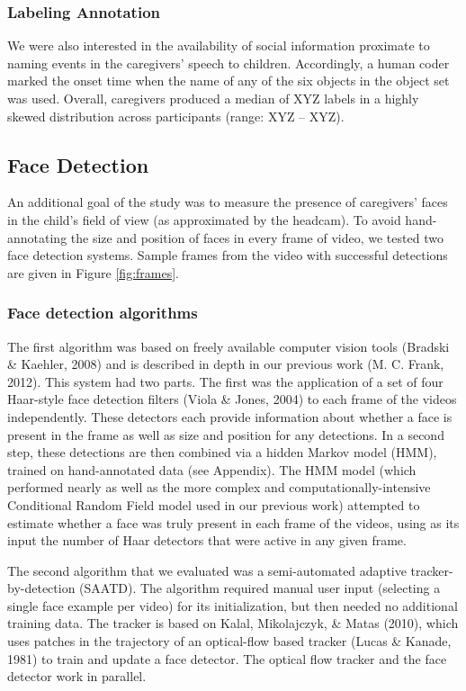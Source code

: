 \documentclass[a4paper,man,apacite,floatsintext,longtable]{apa6}
\begin{document}
\subsubsection{Labeling Annotation}\label{labeling-annotation}

We were also interested in the availability of social information
proximate to naming events in the caregivers' speech to children.
Accordingly, a human coder marked the onset time when the name of any of
the six objects in the object set was used. Overall, caregivers produced
a median of XYZ labels in a highly skewed distribution across
participants (range: XYZ -- XYZ).

\subsection{Face Detection}\label{face-detection}

An additional goal of the study was to measure the presence of
caregivers' faces in the child's field of view (as approximated by the
headcam). To avoid hand-annotating the size and position of faces in
every frame of video, we tested two face detection systems. Sample
frames from the video with successful detections are given in Figure
\ref{fig:frames}.

\subsubsection{Face detection
algorithms}\label{face-detection-algorithms}

The first algorithm was based on freely available computer vision tools
(Bradski \& Kaehler, 2008) and is described in depth in our previous
work (M. C. Frank, 2012). This system had two parts. The first was the
application of a set of four Haar-style face detection filters (Viola \&
Jones, 2004) to each frame of the videos independently. These detectors
each provide information about whether a face is present in the frame as
well as size and position for any detections. In a second step, these
detections are then combined via a hidden Markov model (HMM), trained on
hand-annotated data (see Appendix). The HMM model (which performed
nearly as well as the more complex and computationally-intensive
Conditional Random Field model used in our previous work) attempted to
estimate whether a face was truly present in each frame of the videos,
using as its input the number of Haar detectors that were active in any
given frame.

The second algorithm that we evaluated was a semi-automated adaptive
tracker-by-detection (SAATD). The algorithm required manual user input
(selecting a single face example per video) for its initialization, but
then needed no additional training data. The tracker is based on Kalal,
Mikolajczyk, \& Matas (2010), which uses patches in the trajectory of an
optical-flow based tracker (Lucas \& Kanade, 1981) to train and update a
face detector. The optical flow tracker and the face detector work in
parallel.
\end{document}
